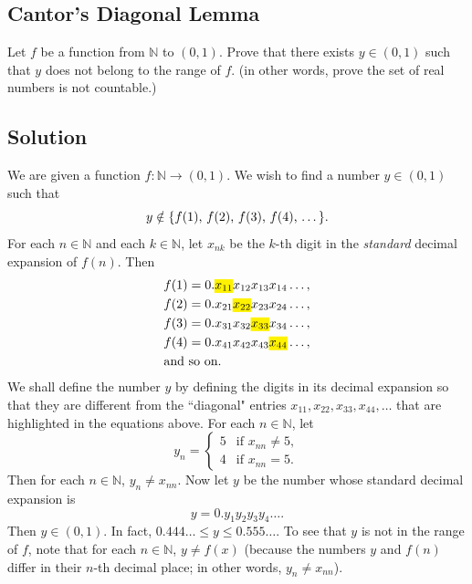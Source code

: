 \documentclass{article}
\begin{document}
\vspace{3mm}
\subsection*{Cantor's Diagonal Lemma}
    Let $f$ be a function from $\mathbb{N}$ to $(0, 1)$. Prove that there exists $y \in (0, 1)$ such that $y$ does not belong to the range of $f$. (in other words, prove the set of real numbers is not countable.)

\vspace{1.5mm}
\subsection*{Solution}
    We are given a function $f: \mathbb{N} \rightarrow (0, 1)$. We wish to find a number $y \in (0, 1)$ such that $$y \notin \{\text{$f(1)$, $f(2)$, $f(3)$, $f(4)$, \dots}\}.$$ For each $n \in \mathbb{N}$ and each $k \in \mathbb{N}$, let $x_{nk}$ be the $k$-th digit in the \textit{standard} decimal expansion of $f(n)$. Then 
    \begin{align*}
        &f(1) = 0.\text{\hl{$x_{11}$}}x_{12}x_{13}x_{14}\dots, \\
        &f(2) = 0.x_{21}\text{\hl{$x_{22}$}}x_{23}x_{24}\dots, \\
        &f(3) = 0.x_{31}x_{32}\text{\hl{$x_{33}$}}x_{34}\dots, \\
        &f(4) = 0.x_{41}x_{42}x_{43}\text{\hl{$x_{44}$}}\dots, \\
        &\text{and so on}.
    \end{align*}
    We shall define the number $y$ by defining the digits in its decimal expansion so that they are different from the ``diagonal" entries $x_{11}, x_{22}, x_{33}, x_{44}, \dots$ that are highlighted in the equations above. For each $n \in \mathbb{N}$, let
    $$y_n = 
    \begin{cases}
        5 & \text{if } x_{nn} \ne 5, \\
        4 & \text{if } x_{nn} = 5.
    \end{cases}$$
    Then for each $n \in \mathbb{N}$, $y_n \ne x_{nn}$. Now let $y$ be the number whose standard decimal expansion is $$y = 0.y_1y_2y_3y_4 \dots.$$ Then $y \in (0, 1)$. In fact, $0.444 \ldots \le y \le 0.555 \dots$. To see that $y$ is not in the range of $f$, note that for each $n \in \mathbb{N}$, $y \ne f(x)$ (because the numbers $y$ and $f(n)$ differ in their $n$-th decimal place; in other words, $y_n \ne x_{nn}$).
\end{document}
